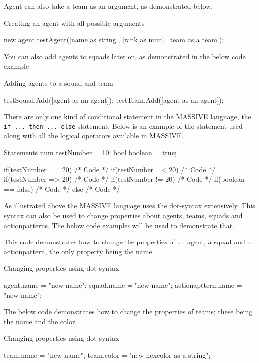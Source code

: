 Agent can also take a team as an argument, as demonstrated below.
\begin{source}{Creating an agent with all possible arguments}{}

new agent testAgent([name as string], [rank as num], [team as a team]);

\end{source}

You can also add agents to squads later on, as demonstrated in the below code example
\begin{source}{Adding agents to a squad and team}{}

testSquad.Add([agent as an agent]);
testTeam.Add([agent as an agent]);

\end{source}

There are only one kind of conditional statement in the MASSIVE language, the \texttt{if ... then ... else}-statement. Below is an example of the statement used along with all the logical operators available in MASSIVE.

\begin{source}{Statements}{}
num testNumber = 10;
bool boolean = true;

if(testNumber == 20)
{
		/* Code */
}
if(testNumber =< 20)
{
		/* Code */
}
if(testNumber => 20)
{
		/* Code */
}
if(testNumber != 20)
{
		/* Code */
}
if(boolean == false)
{
		/* Code */
}
else
{
		/* Code */
}
\end{source}

As illustrated above the MASSIVE language uses the dot-syntax extensively. This syntax can also be used to change properties about agents, teams, squads and actionpatterns. The below code examples will be used to demonstrate that.

This code demonstrates how to change the properties of an agent, a squad and an actionpattern, the only property being the name.

\begin{Source}{Changing properties using dot-syntax}{}

agent.name = "new name";
squad.name = "new name";
actionapttern.name = "new name";

\end{Source}

The below code demonstrates how to change the properties of teams; these being the name and the color.

\begin{source}{Changing properties using dot-syntax}{}

team.name = "new name";
team.color = "new hexcolor as a string";

\end{source}

